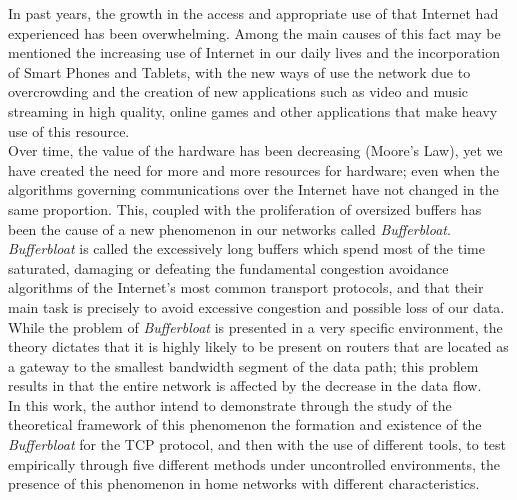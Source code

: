 In past years, the growth in the access and appropriate use of that Internet had experienced has been overwhelming. Among the main causes of this fact may be mentioned the increasing use of Internet in our daily lives and the incorporation of Smart Phones and Tablets, with the new ways of use the network due to overcrowding and the creation of new applications such as video and music streaming in high quality, online games and other applications that make heavy use of this resource.
\\

Over time, the value of the hardware has been decreasing (Moore's Law), yet we have created the need for more and more resources for hardware; even when the algorithms governing communications over the Internet have not changed in the same proportion. This, coupled with the proliferation of oversized buffers has been the cause of a new phenomenon in our networks called \textit{Bufferbloat}.
\\

\textit{Bufferbloat} is called the excessively long buffers which spend most of the time saturated, damaging or defeating the fundamental congestion avoidance algorithms of the Internet's most common transport protocols, and that their main task is precisely to avoid excessive congestion and possible loss of our data.
\\

While the problem of \textit{Bufferbloat} is presented in a very specific environment, the theory dictates that it is highly likely to be present on routers that are located as a gateway to the smallest bandwidth segment of the data path; this problem results in that the entire network is affected by the decrease in the data flow.
\\

In this work, the author intend to demonstrate through the study of the theoretical framework of this phenomenon the formation and existence  of the \textit{Bufferbloat} for the TCP protocol, and then with the use of different tools, to test empirically through five different methods under uncontrolled environments, the presence of this phenomenon in home networks with different characteristics.
